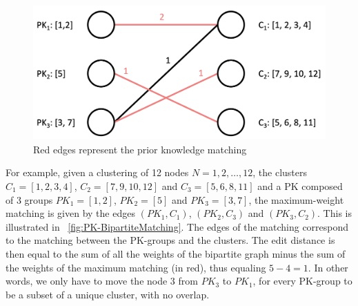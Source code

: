 


\begin{figure}[!ht]
\centering
\includegraphics[width=0.7\linewidth]{static/figures/PK-Clustering/VISPaperFigures/bipartiteMatching.png}
\caption{Red edges represent the prior knowledge matching}
\label{fig:PK-BipartiteMatching}
\end{figure}


For example, given a clustering of 12 nodes $N = {1,2, \ldots, 12}$, the clusters $C_1 = [1,2,3,4]$, $C_2 = [7,9,10,12]$ and $C_3 = [5,6,8,11]$ and a PK composed of 3 groups $PK_1 = [1,2]$, $PK_2 = [5]$ and $PK_3 = [3,7]$, the maximum-weight matching is given by the edges $(PK_1, C_1)$, $(PK_2, C_3)$ and $(PK_3, C_2)$. This is illustrated in ~\autoref{fig:PK-BipartiteMatching}. The edges of the matching correspond to the matching between the PK-groups and the clusters. The edit distance is then equal to the sum of all the weights of the bipartite graph minus the sum of the weights of the maximum matching (in red), thus equaling $5 - 4 = 1$. In other words, we only have to move the node $3$ from $PK_3$ to $PK_1$, for every PK-group to be a subset of a unique cluster, with no overlap.


